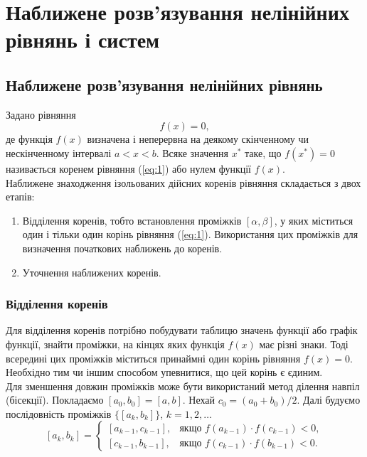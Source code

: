 \section{Наближене розв'язування нелінійних рівнянь і систем}

\subsection{Наближене розв'язування нелінійних рівнянь}

Задано рівняння
\begin{equation}
	\label{eq:1}
	f(x) = 0,
\end{equation}
де функція $f(x)$ визначена і неперервна на деякому скінченному чи нескінченному інтервалі $a < x < b$.  Всяке значення $x^*$ таке, що $f(x^*) = 0$ називається коренем рівняння (\ref{eq:1}) або нулем функції $f(x)$. \\

Наближене знаходження ізольованих дійсних коренів рівняння складається з двох етапів:
\begin{enumerate}
	\item Відділення коренів, тобто встановлення проміжків $[\alpha, \beta]$, у яких міститься один і тільки один корінь рівняння (\ref{eq:1}). Використання цих проміжків для визначення початкових наближень до коренів.
	\item Уточнення наближених коренів.
\end{enumerate}

\subsubsection{Відділення коренів}

Для відділення коренів потрібно побудувати таблицю значень функції або графік функції, знайти проміжки, на кінцях яких функція $f(x)$ має різні знаки. Тоді всередині цих проміжків міститься принаймні один корінь рівняння $f(x) = 0$. Необхідно тим чи іншим способом упевнитися, що цей корінь є єдиним. \\

Для зменшення довжин проміжків може бути використаний метод ділення навпіл (бісекції). Покладаємо $[a_0, b_0] = [a, b]$. Нехай $c_0 = (a_0 + b_0) / 2$. Далі будуємо послідовність проміжків $\{ [a_k, b_k] \}$, $k = 1, 2, \ldots$ 
\[ [a_k, b_k] = \begin{cases} [a_{k-1}, c_{k-1}], & \text{якщо } f(a_{k-1}) \cdot f(c_{k-1}) < 0, \\ [c_{k-1}, b_{k-1}], & \text{якщо } f(c_{k-1}) \cdot f(b_{k-1}) < 0. \end{cases}\]

